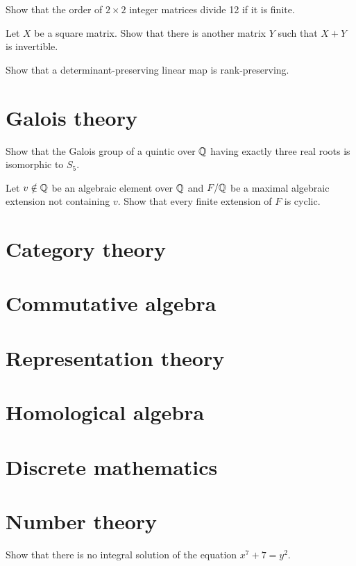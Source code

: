 \documentclass[12pt]{article}
\begin{document}
	\begin{prb}
	Show that the order of $2\times 2$ integer matrices divide 12 if it is finite.
	\end{prb}

	\begin{prb}
	Let $X$ be a square matrix. Show that there is another matrix $Y$ such that $X+Y$ is invertible.
	\end{prb}

	\begin{prb}
	Show that a determinant-preserving linear map is rank-preserving.
	\end{prb}




\section{Galois theory}

	\begin{prb}
	Show that the Galois group of a quintic over $\mathbb{Q}$ having exactly three real roots is isomorphic to $S_5$.
	\end{prb}

	\begin{prb}
	Let $v\notin\mathbb{Q}$ be an algebraic element over $\mathbb{Q}$ and $F/\mathbb{Q}$ be a maximal algebraic extension not containing $v$.
	Show that every finite extension of $F$ is cyclic.
	\end{prb}



\section{Category theory}
\section{Commutative algebra}
\section{Representation theory}
\section{Homological algebra}
\section{Discrete mathematics}
\section{Number theory}
	\begin{prb}
	Show that there is no integral solution of the equation $x^7+7=y^2$.
	\end{prb}
\end{document}
